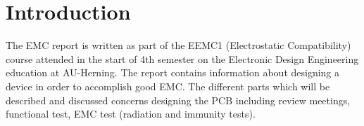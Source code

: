 \chapter{Introduction}
The EMC report is written as part of the EEMC1 (Electrostatic Compatibility) course attended in the start of 4th semester on the Electronic Design Engineering education at AU-Herning. The report contains information about designing a device in order to accomplish good EMC. The different parts which will be described and discussed concerns designing the PCB including review meetings, functional test, EMC test (radiation and immunity tests).

\newpage